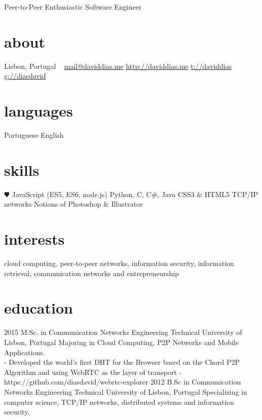 \documentclass[]{friggeri-cv}
\begin{document}
       {Peer-to-Peer Enthusiastic Software Engineer}

\begin{aside}
  \section{about}
    Lisbon, Portugal
    ~
    \href{mailto:mail@daviddias.me}{mail@daviddias.me}
    \href{http://daviddias.me}{http://daviddias.me}
    \href{https://twitter.com/daviddias}{t://daviddias}
    \href{https://github.com/diasdavid}{g://diasdavid}
  \section{languages}
    Portuguese
    English
  \section{skills}
    {\color{red} $\varheartsuit$} JavaScript
    (ES5, ES6, node.js)
    Python, C, C\#, Java
    CSS3 \& HTML5
    TCP/IP networks
    Notions of Photoshop \& Illustrator
\end{aside}

\section{interests}

cloud computing, peer-to-peer networks, information security, information retrieval, communication networks and entrepreneurship

\section{education}

\begin{entrylist}
  \entry
    {2015}
    {M.Sc. in Communication Networks Engineering}
    {Technical University of Lisbon, Portugal}
    {Majoring in Cloud Computing, P2P Networks and Mobile Applications. \\
        - Developed the world's first DHT for the Browser based on the Chord P2P Algorithm and using WebRTC as the layer of transport - https://github.com/diasdavid/webrtc-explorer}
  \entry
    {2012}
    {B.Sc in Communication Networks Engineering}
    {Technical University of Lisbon, Portugal}
    {Specializing in computer science, TCP/IP networks, distributed systems and information security.}
\end{entrylist}
\end{document}
